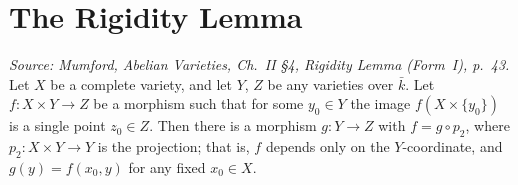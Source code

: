 \section{The Rigidity Lemma}
\begin{lemma}
  \label{thm:rigidity_lemma}
  
  \textit{Source: Mumford, Abelian Varieties, Ch.~II \S4, Rigidity Lemma (Form~I), p.~43.}
  Let \(X\) be a complete variety, and let \(Y\), \(Z\) be any varieties over \(\bar k\). Let
  \(f \colon X \times Y \to Z\) be a morphism such that for some \(y_0 \in Y\) the image
  \(f(X \times \{y_0\})\) is a single point \(z_0 \in Z\). Then there is a morphism
  \(g \colon Y \to Z\) with \(f = g \circ p_2\), where \(p_2 \colon X \times Y \to Y\) is the
  projection; that is, \(f\) depends only on the \(Y\)-coordinate, and \(g(y) = f(x_0, y)\) for any
  fixed \(x_0 \in X\).
\end{lemma}
